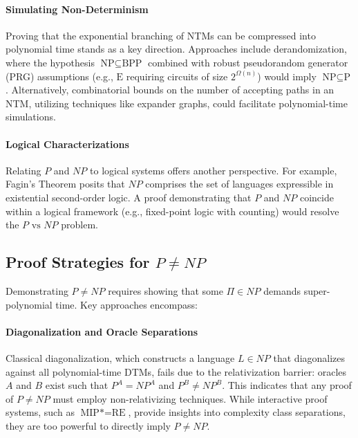 \documentclass[acmsmall]{acmart}
\begin{document}
	\paragraph{\textbf{Simulating Non-Determinism}}
	
	\hspace{0.7em}Proving that the exponential branching of NTMs can be compressed into polynomial time stands as a key direction. Approaches include derandomization, where the hypothesis \( \text{NP} \subseteq \text{BPP} \) combined with robust pseudorandom generator (PRG) assumptions (e.g., \( \text{E} \) requiring circuits of size \( 2^{\Omega(n)} \)) would imply \( \text{NP} \subseteq \text{P} \). Alternatively, combinatorial bounds on the number of accepting paths in an NTM, utilizing techniques like expander graphs, could facilitate polynomial-time simulations.
	
	\paragraph{\textbf{Logical Characterizations}}
	
	\hspace{0.7em}Relating \( P \) and \( NP \) to logical systems offers another perspective. For example, Fagin's Theorem posits that \( NP \) comprises the set of languages expressible in existential second-order logic. A proof demonstrating that \( P \) and \( NP \) coincide within a logical framework (e.g., fixed-point logic with counting) would resolve the \( P \text{ vs } NP \) problem.
	
	\subsection{Proof Strategies for \( P \neq NP \)}
	
	Demonstrating \( P \neq NP \) requires showing that some \( \Pi \in NP \) demands super-polynomial time. Key approaches encompass:
	
	\paragraph{\textbf{Diagonalization and Oracle Separations}}
	
	\hspace{0.7em}Classical diagonalization, which constructs a language \( L \in NP \) that diagonalizes against all polynomial-time DTMs, fails due to the relativization barrier: oracles \( A \) and \( B \) exist such that \( P^A = NP^A \) and \( P^B \neq NP^B \). This indicates that any proof of \( P \neq NP \) must employ non-relativizing techniques. While interactive proof systems, such as \( \text{MIP*} = \text{RE} \), provide insights into complexity class separations, they are too powerful to directly imply \( P \neq NP \).
	
\end{document}
